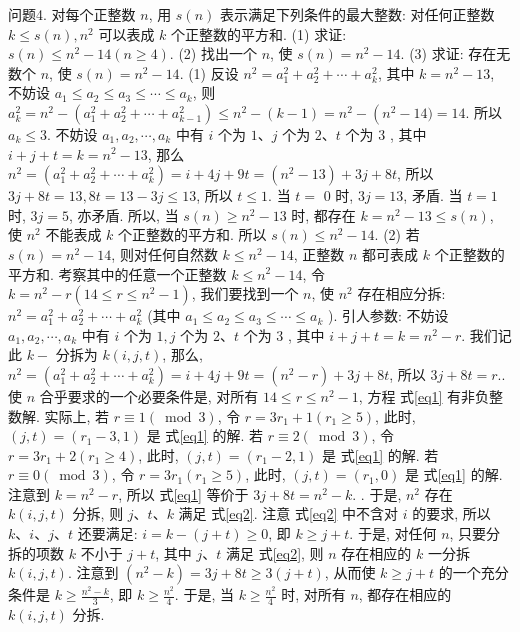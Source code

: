 问题4. 对每个正整数 $n$, 用 $s(n)$ 表示满足下列条件的最大整数: 对任何正整数 $k \leqslant s(n), n^2$ 可以表成 $k$ 个正整数的平方和.
(1) 求证: $s(n) \leqslant n^2- 14(n \geqslant 4)$. (2) 找出一个 $n$, 使 $s(n)=n^2-14$. (3) 求证: 存在无数个 $n$, 使 $s(n)=n^2-14$. 
(1) 反设 $n^2=a_1^2+a_2^2+\cdots+a_k^2$, 其中 $k=n^2-13$, 不妨设 $a_1 \leqslant a_2 \leqslant a_3 \leqslant \cdots \leqslant a_k$, 则 $a_k^2=n^2-\left(a_1^2+a_2^2+\cdots+a_{k-1}^2\right) \leqslant n^2-(k-1)=n^2-\left(n^2-\right. 14)=14$. 所以 $a_k \leqslant 3$. 不妨设 $a_1, a_2, \cdots, a_k$ 中有 $i$ 个为 $1 、 j$ 个为 $2 、 t$ 个为 3 , 其中 $i+j+t=k=n^2-13$, 那么 $n^2=\left(a_1^2+a_2^2+\cdots+a_k^2\right)=i+4 j+9 t= \left(n^2-13\right)+3 j+8 t$, 所以 $3 j+8 t=13,8 t=13-3 j \leqslant 13$, 所以 $t \leqslant 1$. 当 $t=$ 0 时, $3 j=13$, 矛盾.
当 $t=1$ 时, $3 j=5$, 亦矛盾.
所以, 当 $s(n) \geqslant n^2-13$ 时, 都存在 $k=n^2-13 \leqslant s(n)$, 使 $n^2$ 不能表成 $k$ 个正整数的平方和.
所以 $s(n) \leqslant n^2-14$. 
(2) 若 $s(n)=n^2-14$, 则对任何自然数 $k \leqslant n^2-14$, 正整数 $n$ 都可表成 $k$ 个正整数的平方和.
考察其中的任意一个正整数 $k \leqslant n^2-14$, 令 $k=n^2- r\left(14 \leqslant r \leqslant n^2-1\right)$, 我们要找到一个 $n$, 使 $n^2$ 存在相应分拆: $n^2=a_1^2+ a_2^2+\cdots+a_k^2$ (其中 $a_1 \leqslant a_2 \leqslant a_3 \leqslant \cdots \leqslant a_k$ ). 引人参数: 不妨设 $a_1, a_2, \cdots, a_k$ 中有 $i$ 个为 $1, j$ 个为 $2 、 t$ 个为 3 , 其中 $i+j+t=k=n^2-r$. 我们记此 $k-$ 分拆为 $k(i, j, t)$, 那么, $n^2=\left(a_1^2+a_2^2+\cdots+a_k^2\right)=i+4 j+9 t=\left(n^2-r\right)+ 3 j+8 t$, 所以 $3 j+8 t=r . \label{eq1}$. 使 $n$ 合乎要求的一个必要条件是, 对所有 $14 \leqslant r \leqslant n^2-1$, 方程 式\ref{eq1} 有非负整数解.
实际上, 若 $r \equiv 1(\bmod 3)$, 令 $r=3 r_1+ 1\left(r_1 \geqslant 5\right)$, 此时, $(j, t)=\left(r_1-3,1\right)$ 是 式\ref{eq1} 的解.
若 $r \equiv 2(\bmod 3)$, 令 $r=3 r_1+ 2\left(r_1 \geqslant 4\right)$, 此时, $(j, t)=\left(r_1-2,1\right)$ 是 式\ref{eq1} 的解.
若 $r \equiv 0(\bmod 3)$, 令 $r=3 r_1 \left(r_1 \geqslant 5\right)$, 此时, $(j, t)=\left(r_1, 0\right)$ 是 式\ref{eq1} 的解.
注意到 $k=n^2-r$, 所以 式\ref{eq1} 等价于 $3 j+8 t=n^2-k .\label{eq2}$ . 于是, $n^2$ 存在 $k(i, j, t)$ 分拆, 则 $j 、 t 、 k$ 满足 式\ref{eq2}. 注意 式\ref{eq2} 中不含对 $i$ 的要求, 所以 $k 、 i 、 j 、 t$ 还要满足: $i=k-(j+t) \geqslant 0$, 即 $k \geqslant j+t$. 于是, 对任何 $n$, 只要分拆的项数 $k$ 不小于 $j+t$, 其中 $j 、 t$ 满足 式\ref{eq2}, 则 $n$ 存在相应的 $k$ 一分拆 $k(i, j, t)$. 注意到 $\left(n^2-k\right)=3 j+8 t \geqslant 3(j+t)$, 从而使 $k \geqslant j+t$ 的一个充分条件是 $k \geqslant \frac{n^2-k}{3}$, 即 $k \geqslant \frac{n^2}{4}$. 于是, 当 $k \geqslant \frac{n^2}{4}$ 时, 对所有 $n$, 都存在相应的 $k(i, j, t)$ 分拆.
